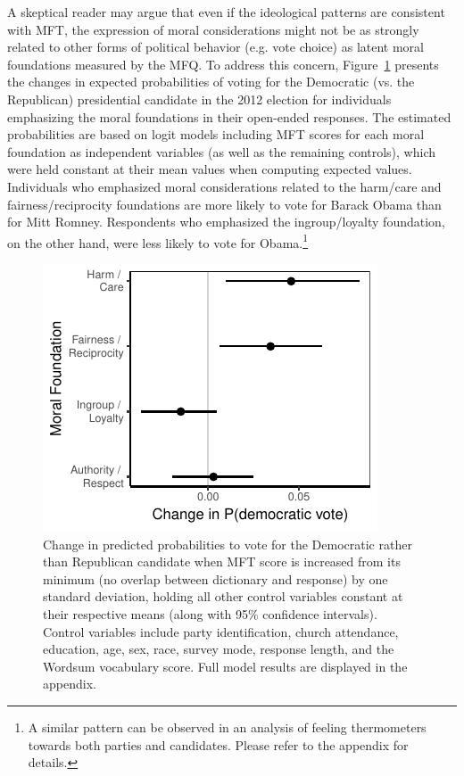 \documentclass[12pt]{article}
\begin{document}
A skeptical reader may argue that even if the ideological patterns are consistent with MFT, the expression of moral considerations might not be as strongly related to other forms of political behavior (e.g. vote choice) as latent moral foundations measured by the MFQ. To address this concern, Figure~\ref{fig:logit_vote} presents the changes in expected probabilities of voting for the Democratic (vs. the Republican) presidential candidate in the 2012 election for individuals emphasizing the moral foundations in their open-ended responses. The estimated probabilities are based on logit models including MFT scores for each moral foundation as independent variables (as well as  the remaining controls), which were held constant at their mean values when computing expected values. Individuals who emphasized moral considerations related to the harm/care and fairness/reciprocity foundations are more likely to vote for Barack Obama than for Mitt Romney. Respondents who emphasized the ingroup/loyalty foundation, on the other hand, were less likely to vote for Obama.\footnote{A similar pattern can be observed in an analysis of feeling thermometers towards both parties and candidates. Please refer to the appendix for details.}

\begin{figure}[ht]\centering
\includegraphics[scale=.9]{../calc/fig/logit_vote.pdf}
\caption{Change in predicted probabilities to vote for the Democratic rather than Republican candidate when MFT score is increased from its minimum (no overlap between dictionary and response) by one standard deviation, holding all other control variables constant at their respective means (along with 95\% confidence intervals). Control variables include party identification, church attendance, education, age, sex, race, survey mode, response length, and the Wordsum vocabulary score. Full model results are displayed in the appendix.
}\label{fig:logit_vote}
\end{figure}
\end{document}

